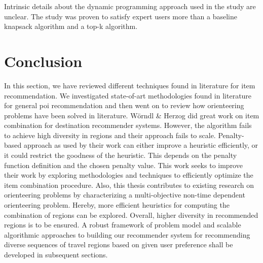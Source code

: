 Intrinsic details about the dynamic programming approach used in the study are unclear. The study was proven to satisfy expert users more than a baseline knapsack algorithm and a top-k algorithm. 


\section{Conclusion}
In this section, we have reviewed different techniques found in literature for item recommendation. We investigated state-of-art methodologies found in literature for general \gls{poi} recommendation and then went on to review how orienteering problems have been solved in literature.
Wörndl \& Herzog \parencite{cbrecsys2014} did great work on item combination for destination recommender systems. However, the algorithm fails to achieve high diversity in regions \parencite{cbrecsys2014} and their approach fails to scale. Penalty-based approach as used by their work can either improve a heuristic efficiently, or it could restrict the goodness of the heuristic. This depends on the penalty function definition and the chosen penalty value. This work seeks to improve their work by exploring methodologies and techniques to efficiently optimize the item combination procedure. Also, this thesis contributes to existing research on orienteering problems by characterizing a multi-objective non-time dependent orienteering problem. Hereby, more efficient heuristics for computing the combination of regions can be explored. Overall, higher diversity in recommended regions is to be ensured. A robust framework of problem model and scalable algorithmic approaches to building our recommender system for recommending diverse sequences of travel regions based on given user preference shall be developed in subsequent sections.
